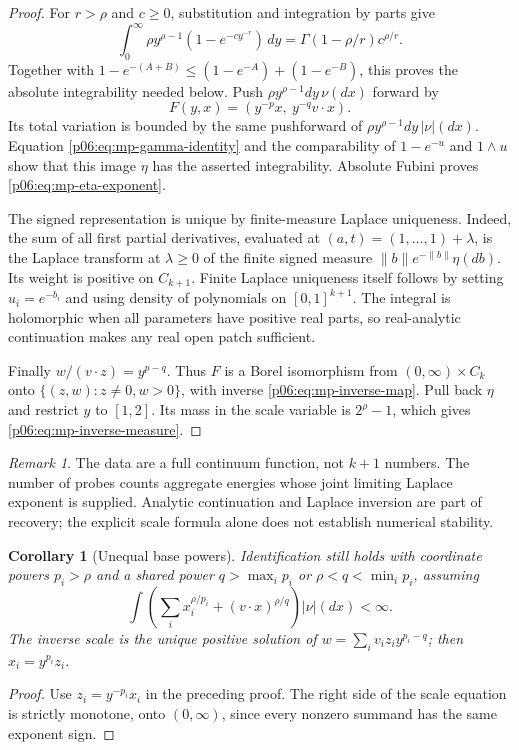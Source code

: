 \documentclass[11pt,letterpaper]{article}
\newtheorem{corollary}[theorem]{Corollary}
\theoremstyle{definition}
\theoremstyle{remark}
\newtheorem{remark}[theorem]{Remark}
\newcommand{\1}{\mathbf 1}
\begin{document}
\begin{proof}
For $r>\rho$ and $c\ge0$, substitution and integration by parts give
\begin{equation}\label{p06:eq:mp-gamma-identity}
 \int_0^\infty\rho y^{\rho-1}(1-e^{-cy^{-r}})\,dy
       =\Gamma(1-\rho/r)c^{\rho/r}.
\end{equation}
Together with $1-e^{-(A+B)}\le(1-e^{-A})+(1-e^{-B})$,
this proves the absolute integrability needed below.
Push $\rho y^{\rho-1}dy\,\nu(dx)$ forward by
\[
 F(y,x)=(y^{-p}x,\ y^{-q}v\cdot x).
\]
Its total variation is bounded by the same pushforward of
$\rho y^{\rho-1}dy\,|\nu|(dx)$. Equation
\eqref{p06:eq:mp-gamma-identity} and the comparability of $1-e^{-u}$
and $1\wedge u$ show that this image $\eta$ has the asserted
integrability. Absolute Fubini proves \eqref{p06:eq:mp-eta-exponent}.

The signed representation is unique by finite-measure Laplace
uniqueness. Indeed, the sum of all first partial derivatives,
evaluated at $(a,t)=(1,\ldots,1)+\lambda$, is the Laplace transform
at $\lambda\ge0$ of the finite signed measure
$\|b\|e^{-\|b\|}\eta(db)$. Its weight is positive on $C_{k+1}$.
Finite Laplace uniqueness itself follows by setting $u_i=e^{-b_i}$
and using density of polynomials on $[0,1]^{k+1}$.
The integral is holomorphic when all parameters have positive real
parts, so real-analytic continuation makes any real open patch
sufficient.

Finally $w/(v\cdot z)=y^{p-q}$. Thus $F$ is a Borel isomorphism
from $(0,\infty)\times C_k$ onto $\{(z,w):z\ne0,w>0\}$,
with inverse \eqref{p06:eq:mp-inverse-map}. Pull back $\eta$ and restrict
$y$ to $[1,2]$. Its mass in the scale variable is $2^\rho-1$,
which gives \eqref{p06:eq:mp-inverse-measure}.
\end{proof}

\begin{remark}\label{p06:rem:mp-data}
The data are a full continuum function, not $k+1$ numbers.
The number of probes counts aggregate energies whose joint limiting
Laplace exponent is supplied. Analytic continuation and Laplace
inversion are part of recovery; the explicit scale formula alone
does not establish numerical stability.
\end{remark}

\begin{corollary}[Unequal base powers]\label{p06:cor:mp-unequal}
Identification still holds with coordinate powers $p_i>\rho$
and a shared power $q>\max_i p_i$ or $\rho<q<\min_i p_i$,
assuming
\[
 \int\left(\sum_i x_i^{\rho/p_i}+(v\cdot x)^{\rho/q}\right)
       |\nu|(dx)<\infty.
\]
The inverse scale is the unique positive solution of
$w=\sum_i v_i z_i y^{p_i-q}$; then $x_i=y^{p_i}z_i$.
\end{corollary}
\begin{proof}
Use $z_i=y^{-p_i}x_i$ in the preceding proof.
The right side of the scale equation is strictly monotone, onto
$(0,\infty)$, since every nonzero summand has the same exponent sign.
\end{proof}
\end{document}

